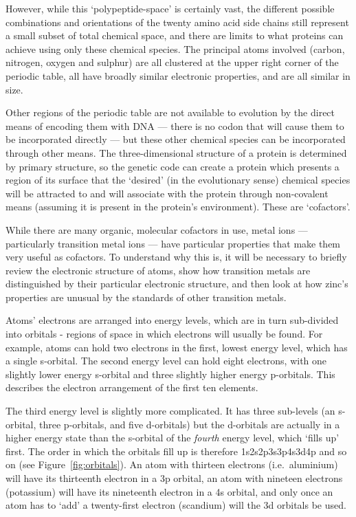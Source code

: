 However, while this `polypeptide-space' is certainly vast, the different possible combinations and orientations of the twenty amino acid side chains still represent a small subset of total chemical space, and there are limits to what proteins can achieve using only these chemical species. The principal atoms involved (carbon, nitrogen, oxygen and sulphur) are all clustered at the upper right corner of the periodic table, all have broadly similar electronic properties, and are all similar in size.

Other regions of the periodic table are not available to evolution by the direct means of encoding them with DNA --- there is no codon that will cause them to be incorporated directly --- but these other chemical species can be incorporated through other means. The three-dimensional structure of a protein is determined by primary structure, so the genetic code can create a protein which presents a region of its surface that the `desired' (in the evolutionary sense) chemical species will be attracted to and will associate with the protein through non-covalent means (assuming it is present in the protein's environment). These are `cofactors'.

While there are many organic, molecular cofactors in use, metal ions --- particularly transition metal ions --- have particular properties that make them very useful as cofactors. To understand why this is, it will be necessary to briefly review the electronic structure of atoms, show how transition metals are distinguished by their particular electronic structure, and then look at how zinc's properties are unusual by the standards of other transition metals.

Atoms' electrons are arranged into energy levels, which are in turn sub-divided into orbitals - regions of space in which electrons will usually be found. For example, atoms can hold two electrons in the first, lowest energy level, which has a single s-orbital. The second energy level can hold eight electrons, with one slightly lower energy s-orbital and three slightly higher energy p-orbitals. This describes the electron arrangement of the first ten elements.

The third energy level is slightly more complicated. It has three sub-levels (an s-orbital, three p-orbitals, and five d-orbitals) but the d-orbitals are actually in a higher energy state than the s-orbital of the \emph{fourth} energy level, which `fills up' first. The order in which the orbitals fill up is therefore 1s2s2p3s3p4s3d4p and so on (see Figure~\ref{fig:orbitals}). An atom with thirteen electrons (i.e.\ aluminium) will have its thirteenth electron in a 3p orbital, an atom with nineteen electrons (potassium) will have its nineteenth electron in a 4s orbital, and only once an atom has to `add' a twenty-first electron (scandium) will the 3d orbitals be used.

